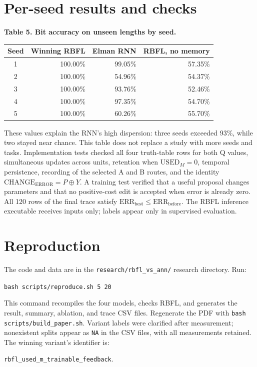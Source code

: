 \documentclass[10pt,a4paper]{article}
\newcommand{\UM}{\mathrm{USED}_{M}}
\newcommand{\CE}{\mathrm{CHANGE}_{\mathrm{ERROR}}}
\newenvironment{fixedtable}[1]{\par\medskip\noindent\begin{minipage}{\linewidth}\centering\small\textbf{#1}\par\smallskip}{\end{minipage}\par\medskip}
\begin{document}
\section{Per-seed results and checks}
\begin{fixedtable}{Table 5. Bit accuracy on unseen lengths by seed.}
\begin{tabular}{crrr}
\toprule
Seed & Winning RBFL & Elman RNN & RBFL, no memory \\
\midrule
1 & 100.00\% & 99.05\% & 57.35\% \\
2 & 100.00\% & 54.96\% & 54.37\% \\
3 & 100.00\% & 93.76\% & 52.46\% \\
4 & 100.00\% & 97.35\% & 54.70\% \\
5 & 100.00\% & 60.26\% & 55.70\% \\
\bottomrule
\end{tabular}
\end{fixedtable}

These values explain the RNN's high dispersion: three seeds exceeded 93\%, while two stayed near chance. This table does not replace a study with more seeds and tasks. Implementation tests checked all four truth-table rows for both Q values, simultaneous updates across units, retention when $\UM=0$, temporal persistence, recording of the selected A and B routes, and the identity $\CE=P\oplus Y$. A training test verified that a useful proposal changes parameters and that no positive-cost edit is accepted when error is already zero. All 120 rows of the final trace satisfy $\mathrm{ERR}_{\mathrm{best}}\leq\mathrm{ERR}_{\mathrm{before}}$. The RBFL inference executable receives inputs only; labels appear only in supervised evaluation.

\section{Reproduction}
The code and data are in the \texttt{research/rbfl\_vs\_ann/} research directory. Run:
\begin{center}\texttt{bash scripts/reproduce.sh 5 20}\end{center}
This command recompiles the four models, checks RBFL, and generates the result, summary, ablation, and trace CSV files. Regenerate the PDF with \texttt{bash scripts/build\_paper.sh}. Variant labels were clarified after measurement; nonexistent splits appear as \texttt{NA} in the CSV files, with all measurements retained. The winning variant's identifier is:
\begin{center}
\texttt{rbfl\_used\_m\_trainable\_feedback}.
\end{center}
\end{document}
